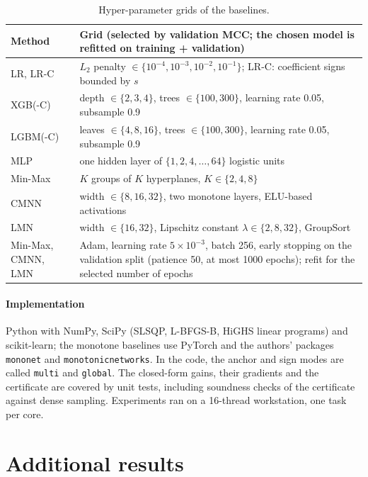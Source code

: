\documentclass[11pt,a4paper]{article}
\begin{document}
\begin{table}[H]\centering\small
\caption{Hyper-parameter grids of the baselines.}\label{tab:hyper}
\begin{tabular}{@{}lp{}@{}}\toprule
Method & Grid (selected by validation MCC; the chosen model is refitted on training + validation) \\\midrule
LR, LR-C & $L_2$ penalty $\in\{10^{-4},10^{-3},10^{-2},10^{-1}\}$; LR-C: coefficient signs bounded by $s$ \\
XGB(-C) & depth $\in\{2,3,4\}$, trees $\in\{100,300\}$, learning rate 0.05, subsample 0.9 \\
LGBM(-C) & leaves $\in\{4,8,16\}$, trees $\in\{100,300\}$, learning rate 0.05, subsample 0.9 \\
MLP & one hidden layer of $\{1,2,4,\dots,64\}$ logistic units \\
Min-Max & $K$ groups of $K$ hyperplanes, $K\in\{2,4,8\}$ \\
CMNN & width $\in\{8,16,32\}$, two monotone layers, ELU-based activations \\
LMN & width $\in\{16,32\}$, Lipschitz constant $\lambda\in\{2,8,32\}$, GroupSort \\
Min-Max, CMNN, LMN & Adam, learning rate $5\times10^{-3}$, batch 256, early stopping on the validation split (patience 50, at most 1000 epochs); refit for the selected number of epochs \\
\bottomrule\end{tabular}
\end{table}

\paragraph{Implementation}
Python with NumPy, SciPy (SLSQP, L-BFGS-B, HiGHS linear programs) and scikit-learn; the monotone baselines use PyTorch
and the authors' packages \texttt{mononet} and \texttt{monotonicnetworks}. In the code, the anchor and sign modes are
called \texttt{multi} and \texttt{global}. The closed-form gains, their gradients and the certificate are covered by unit
tests, including soundness checks of the certificate against dense sampling. Experiments ran on a 16-thread
workstation, one task per core.

\section{Additional results}\label{sup:more}
\end{document}
